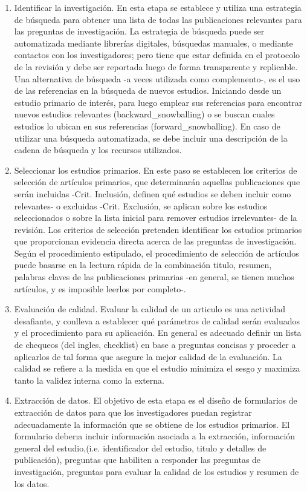 \begin{enumerate}[label=(\roman*)] 
\item Identificar la investigación. En esta etapa se establece y utiliza una estrategia de búsqueda para obtener una lista de todas las publicaciones relevantes para las preguntas de investigación. La estrategia de búsqueda puede ser automatizada mediante librerías digitales, búsquedas manuales, o mediante contactos con los investigadores; pero tiene que estar definida en el protocolo de la revisión y debe ser reportada luego de forma transparente y replicable. Una alternativa de búsqueda -a veces utilizada como complemento-, es el uso de las referencias en la búsqueda de nuevos estudios. Iniciando desde un estudio primario de interés, para luego emplear sus referencias para encontrar nuevos estudios relevantes (\gls{backward_snowballing}) o se buscan cuales estudios lo ubican en sus referencias (\gls{forward_snowballing}). En caso de utilizar una búsqueda automatizada, se debe incluir una descripción de la cadena de búsqueda y los recursos utilizados.
  \item Seleccionar los estudios primarios. En este paso se establecen los criterios de selección de artículos primarios, que determinarán aquellas publicaciones que serán incluidas -Crit. Inclusión, definen qué estudios se deben incluir como relevantes- o excluidas -Crit. Exclusión, se aplican sobre los estudios seleccionados o sobre la lista inicial para remover estudios irrelevantes- de la revisión. Los criterios de selección pretenden identificar los estudios primarios que proporcionan evidencia directa acerca de las preguntas de investigación. Según el procedimiento estipulado, el procedimiento de selección de artículos puede basarse en la lectura rápida de la combinación titulo, resumen, palabras claves de las publicaciones primarias -en general, se tienen muchos artículos, y es imposible leerlos por completo-.
  \item Evaluación de calidad. Evaluar la calidad de un articulo es una actividad desafiante, y conlleva a establecer qué parámetros de calidad serán evaluados y el procedimiento para su aplicación. En general es adecuado definir un lista de chequeos (del ingles, checklist) en base a preguntas concisas y proceder a aplicarlos de tal forma que asegure la mejor calidad de la evaluación. La calidad se refiere a la medida en que el estudio minimiza el sesgo y maximiza tanto la validez interna como la externa.
  \item Extracción de datos. El objetivo de esta etapa es el diseño de formularios de extracción de datos para que los investigadores puedan registrar adecuadamente la información que se obtiene de los estudios primarios. El formulario deberıa incluir información asociada a la extracción, información general del estudio,(i.e. identificador del estudio, titulo y detalles de publicación), preguntas que habiliten a responder las preguntas de investigación, preguntas para evaluar la calidad de los estudios y resumen de los datos.

\end{enumerate}
